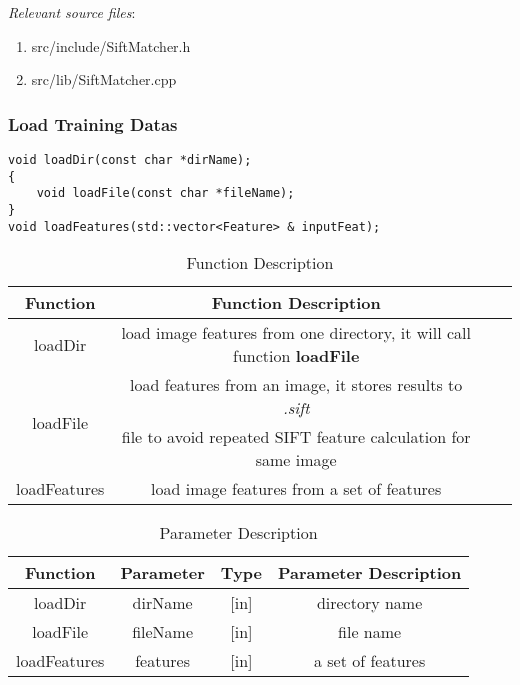 \documentclass[paper=a4, fontsize=11pt]{scrartcl} %
\numberwithin{equation}{section} %
\numberwithin{figure}{section} %
\numberwithin{table}{section} %
\begin{document}
\textsl{Relevant source files}: 

\begin{enumerate}
    \item src/include/SiftMatcher.h
    \item src/lib/SiftMatcher.cpp
\end{enumerate}


\subsubsection{Load Training Datas}

\begin{lstlisting}
void loadDir(const char *dirName);
{
    void loadFile(const char *fileName);
}
void loadFeatures(std::vector<Feature> & inputFeat);
\end{lstlisting}


\begin{table}[h]
    \centering
    \begin{tabular}{|c|c| lp{}}
        \hline
        \textbf{Function} & \textbf{Function Description} \\\hline
                  loadDir & load image features from one directory, it will call function \textbf{loadFile} \\\hline
\multirow{2}{*}{loadFile} & load features from an image, it stores results to \textsl{.sift} \\& file to avoid repeated SIFT feature calculation for same image \\\hline
loadFeatures & load image features from a set of features \\\hline
    \end{tabular}
    \caption{Function Description}\label{nolock}
\end{table}

\begin{table}[h]
    \centering
    \begin{tabular}{|c|c|c|c|}
        \hline
        \textbf{Function} & \textbf{Parameter} & \textbf{Type} & \textbf{Parameter Description} \\\hline
        loadDir & dirName & [in] & directory name \\\hline
        loadFile& fileName & [in] & file name \\\hline
        loadFeatures & features & [in] & a set of features \\\hline
    \end{tabular}
    \caption{Parameter Description}\label{nolock}
\end{table}
\end{document}
